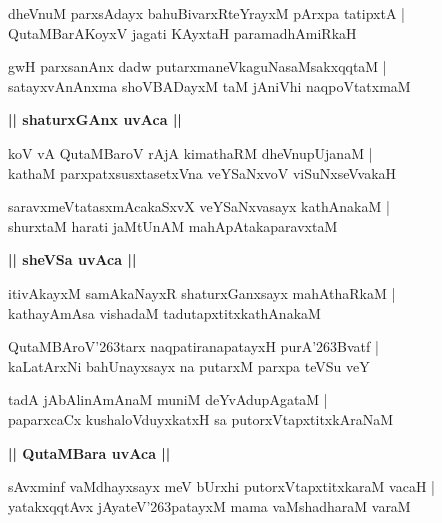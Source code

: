 \documentclass[twoside,12pt,openright]{book}
\def\S{\char'263}
\newcounter{shloka}[chapter]
\def\uvaca#1{\centerline{{\large\textbf{#1}}}}
\begin{document}
\begin{shloka}%
dheVnuM parxsAdayx bahuBivarxRteYrayxM pArxpa tatipxtA |\\
QutaMBarAKoyxV jagati KAyxtaH paramadhAmiRkaH 
\end{shloka}

\begin{shloka}%
gwH parxsanAnx dadw putarxmaneVkaguNasaMsakxqqtaM |\\
satayxvAnAnxma shoVBADayxM taM jAniVhi naqpoVtatxmaM 
\end{shloka}

\uvaca{|| shaturxGAnx uvAca ||}

\begin{shloka}%
koV vA QutaMBaroV rAjA kimathaRM dheVnupUjanaM |\\
kathaM parxpatxsusxtasetxVna veYSaNxvoV viSuNxseVvakaH
\end{shloka}

\begin{shloka}%
saravxmeVtatasxmAcakaSxvX veYSaNxvasayx kathAnakaM |\\
shurxtaM harati jaMtUnAM mahApAtakaparavxtaM 
\end{shloka}

\uvaca{|| sheVSa uvAca ||}

\begin{shloka}%
itivAkayxM samAkaNayxR shaturxGanxsayx mahAthaRkaM |\\
kathayAmAsa vishadaM tadutapxtitxkathAnakaM 
\end{shloka}

\begin{shloka}%
QutaMBAroV\S tarx naqpatiranapatayxH purA\S Bvatf |\\
kaLatArxNi bahUnayxsayx na putarxM parxpa teVSu veY 
\end{shloka}

\begin{shloka}%
tadA jAbAlinAmAnaM muniM deYvAdupAgataM |\\
paparxcaCx kushaloVduyxkatxH sa putorxVtapxtitxkAraNaM 
\end{shloka}

\uvaca{|| QutaMBara uvAca ||}

\begin{shloka}%
sAvxminf vaMdhayxsayx meV bUrxhi putorxVtapxtitxkaraM vacaH |\\
yatakxqqtAvx jAyateV\S patayxM mama vaMshadharaM varaM 
\end{shloka}
\end{document}
